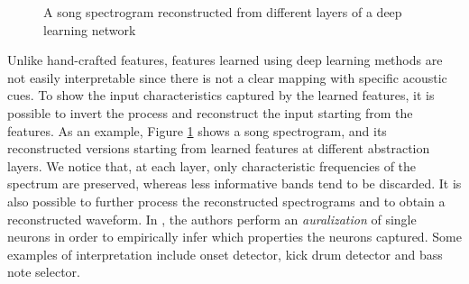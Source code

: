 \begin{figure}[t]
      \caption{A song spectrogram reconstructed from different layers of a deep learning network}
      \label{fig:LLFs:features}          
\end{figure}


Unlike hand-crafted features, features learned using deep learning methods are not easily interpretable since there is not a clear mapping with specific acoustic cues. To show the input characteristics captured by the learned features, it is possible to invert the process and reconstruct the input starting from the features. As an example, Figure \ref{fig:LLFs:features} shows a song spectrogram, and its reconstructed versions starting from learned features at different abstraction layers. We notice that, at each layer, only characteristic frequencies of the spectrum are preserved, whereas less informative bands tend to be discarded. It is also possible to further process the reconstructed spectrograms and to obtain a reconstructed waveform. In \cite{choi2015auralisation}, the authors perform an \textit{auralization} of single neurons in order to empirically infer which properties the neurons captured. Some examples of interpretation include onset detector, kick drum detector and bass note selector. 

